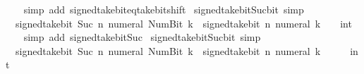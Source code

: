 \begin{isabellebody}
\ \ \isamarkupfalse%
\ {\isacharparenleft}{\kern0pt}simp\ add{\isacharcolon}{\kern0pt}\ signed{\isacharunderscore}{\kern0pt}take{\isacharunderscore}{\kern0pt}bit{\isacharunderscore}{\kern0pt}eq{\isacharunderscore}{\kern0pt}take{\isacharunderscore}{\kern0pt}bit{\isacharunderscore}{\kern0pt}shift{\isacharparenright}{\kern0pt}%
\endisatagproof
{\isafoldproof}%
%
\isadelimproof
\isanewline
%
\endisadelimproof
\isanewline
{}\isamarkupfalse%
\ signed{\isacharunderscore}{\kern0pt}take{\isacharunderscore}{\kern0pt}bit{\isacharunderscore}{\kern0pt}Suc{\isacharunderscore}{\kern0pt}bit{}\ {\isacharbrackleft}{\kern0pt}simp{\isacharbrackright}{\kern0pt}{\isacharcolon}{\kern0pt}\isanewline
\ \ {\isacartoucheopen}signed{\isacharunderscore}{\kern0pt}take{\isacharunderscore}{\kern0pt}bit\ {\isacharparenleft}{\kern0pt}Suc\ n{\isacharparenright}{\kern0pt}\ {\isacharparenleft}{\kern0pt}numeral\ {\isacharparenleft}{\kern0pt}Num{\isachardot}{\kern0pt}Bit{}\ k{\isacharparenright}{\kern0pt}{\isacharparenright}{\kern0pt}\ {\isacharequal}{\kern0pt}\ signed{\isacharunderscore}{\kern0pt}take{\isacharunderscore}{\kern0pt}bit\ n\ {\isacharparenleft}{\kern0pt}numeral\ k{\isacharparenright}{\kern0pt}\ {\isacharasterisk}{\kern0pt}\ {\isacharparenleft}{\kern0pt}{}\ {\isacharcolon}{\kern0pt}{\isacharcolon}{\kern0pt}\ int{\isacharparenright}{\kern0pt}{\isacartoucheclose}\isanewline
%
\isadelimproof
\ \ %
\endisadelimproof
%
\isatagproof
{}\isamarkupfalse%
\ {\isacharparenleft}{\kern0pt}simp\ add{\isacharcolon}{\kern0pt}\ signed{\isacharunderscore}{\kern0pt}take{\isacharunderscore}{\kern0pt}bit{\isacharunderscore}{\kern0pt}Suc{\isacharparenright}{\kern0pt}%
\endisatagproof
{\isafoldproof}%
%
\isadelimproof
\isanewline
%
\endisadelimproof
\isanewline
{}\isamarkupfalse%
\ signed{\isacharunderscore}{\kern0pt}take{\isacharunderscore}{\kern0pt}bit{\isacharunderscore}{\kern0pt}Suc{\isacharunderscore}{\kern0pt}bit{}\ {\isacharbrackleft}{\kern0pt}simp{\isacharbrackright}{\kern0pt}{\isacharcolon}{\kern0pt}\isanewline
\ \ {\isacartoucheopen}signed{\isacharunderscore}{\kern0pt}take{\isacharunderscore}{\kern0pt}bit\ {\isacharparenleft}{\kern0pt}Suc\ n{\isacharparenright}{\kern0pt}\ {\isacharparenleft}{\kern0pt}numeral\ {\isacharparenleft}{\kern0pt}Num{\isachardot}{\kern0pt}Bit{}\ k{\isacharparenright}{\kern0pt}{\isacharparenright}{\kern0pt}\ {\isacharequal}{\kern0pt}\ signed{\isacharunderscore}{\kern0pt}take{\isacharunderscore}{\kern0pt}bit\ n\ {\isacharparenleft}{\kern0pt}numeral\ k{\isacharparenright}{\kern0pt}\ {\isacharasterisk}{\kern0pt}\ {}\ {\isacharplus}{\kern0pt}\ {\isacharparenleft}{\kern0pt}{}\ {\isacharcolon}{\kern0pt}{\isacharcolon}{\kern0pt}\ int{\isacharparenright}{\kern0pt}{\isacartoucheclose}\isanewline

\end{isabellebody}
